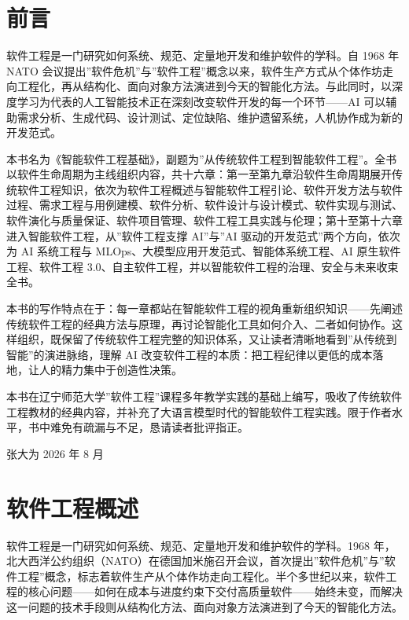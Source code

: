 \documentclass[
]{ctexbook}
\begin{document}
\chapter*{前言}\label{ux524dux8a00}

软件工程是一门研究如何系统、规范、定量地开发和维护软件的学科。自 1968 年
NATO
会议提出''软件危机''与''软件工程''概念以来，软件生产方式从个体作坊走向工程化，再从结构化、面向对象方法演进到今天的智能化方法。与此同时，以深度学习为代表的人工智能技术正在深刻改变软件开发的每一个环节------AI
可以辅助需求分析、生成代码、设计测试、定位缺陷、维护遗留系统，人机协作成为新的开发范式。

本书名为《智能软件工程基础》，副题为''从传统软件工程到智能软件工程''。全书以软件生命周期为主线组织内容，共十六章：第一至第九章沿软件生命周期展开传统软件工程知识，依次为软件工程概述与智能软件工程引论、软件开发方法与软件过程、需求工程与用例建模、软件分析、软件设计与设计模式、软件实现与测试、软件演化与质量保证、软件项目管理、软件工程工具实践与伦理；第十至第十六章进入智能软件工程，从''软件工程支撑
AI''与''AI 驱动的开发范式''两个方向，依次为 AI 系统工程与
MLOps、大模型应用开发范式、智能体系统工程、AI 原生软件工程、软件工程
3.0、自主软件工程，并以智能软件工程的治理、安全与未来收束全书。

本书的写作特点在于：每一章都站在智能软件工程的视角重新组织知识------先阐述传统软件工程的经典方法与原理，再讨论智能化工具如何介入、二者如何协作。这样组织，既保留了传统软件工程完整的知识体系，又让读者清晰地看到''从传统到智能''的演进脉络，理解
AI
改变软件工程的本质：把工程纪律以更低的成本落地，让人的精力集中于创造性决策。

本书在辽宁师范大学''软件工程''课程多年教学实践的基础上编写，吸收了传统软件工程教材的经典内容，并补充了大语言模型时代的智能软件工程实践。限于作者水平，书中难免有疏漏与不足，恳请读者批评指正。

张大为 2026 年 8 月

\chapter{软件工程概述}\label{ux8f6fux4ef6ux5de5ux7a0bux6982ux8ff0}

软件工程是一门研究如何系统、规范、定量地开发和维护软件的学科。1968
年，北大西洋公约组织（NATO）在德国加米施召开会议，首次提出''软件危机''与''软件工程''概念，标志着软件生产从个体作坊走向工程化。半个多世纪以来，软件工程的核心问题------如何在成本与进度约束下交付高质量软件------始终未变，而解决这一问题的技术手段则从结构化方法、面向对象方法演进到了今天的智能化方法。
\end{document}
